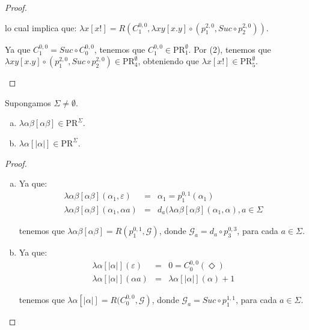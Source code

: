 \begin{proof}
\begin{enumerate}
        \par lo cual implica que: $\lambda x \left[x!\right] = R (C_{1}^{0, 0}, \lambda xy\left[x.y\right] \circ
        (p_{1}^{2, 0}, Suc \circ p_{2}^{2,0}))$.

        \par Ya que $C_{1}^{0, 0} = Suc \circ C_{0}^{0,0}$, tenemos que $C_{1}^{0, 0} \in \mathrm{PR}_{1}^{\emptyset}$.
        Por (2), tenemos que $\lambda xy \left[x.y\right] \circ (p_{1}^{2, 0}, Suc \circ p_{2}^{2,0}) \in
        \mathrm{PR}_{4}^{\emptyset}$, obteniendo que $\lambda x \left[x!\right] \in \mathrm{PR}_{5}^{\emptyset}$.
    \end{enumerate}
  \end{proof}

  \begin{lemma}
    \par Supongamos $\Sigma \neq \emptyset$.

    \begin{enumerate}[a)]
      \item $\lambda \alpha \beta \left[\alpha\beta\right] \in \mathrm{PR}^{\Sigma}$.
      \item $\lambda \alpha \left[\left\vert\alpha \right\vert\right] \in \mathrm{PR}^{\Sigma}$.
    \end{enumerate}
  \end{lemma}
  \begin{proof}
    \begin{enumerate}[a)]
      \item Ya que:
        \begin{eqnarray}
          \nonumber \lambda \alpha \beta \left[\alpha \beta\right](\alpha_{1}, \varepsilon) &=& \alpha_{1} =
          p_{1}^{0,1}(\alpha_{1}) \\
          \nonumber \lambda \alpha \beta \left[\alpha \beta\right](\alpha_{1}, \alpha a) &=& d_{a}(\lambda \alpha \beta
          \left[\alpha \beta\right](\alpha_{1}, \alpha), a \in \Sigma
        \end{eqnarray}

        \par tenemos que $\lambda \alpha \beta \left[\alpha \beta\right] = R(p_{1}^{0, 1}, \mathcal{G})$, donde
        $\mathcal{G}_{a} = d_{a} \circ p_{3}^{0,3}$, para cada $a \in \Sigma$.
      \item Ya que:
        \begin{eqnarray}
          \nonumber \lambda \alpha \left[\left\vert \alpha \right\vert\right](\varepsilon) &=& 0 =
          C_{0}^{0,0}(\Diamond) \\
          \nonumber \lambda \alpha \left[\left\vert \alpha \right\vert\right](\alpha a) &=& \lambda \alpha
          \left[\left\vert \alpha \right\vert\right](\alpha) + 1
        \end{eqnarray}

        \par tenemos que $\lambda \alpha \left[\left\vert \alpha \vert \right] = R(C_{0}^{0, 0}, \mathcal{G}\right)$,
        donde $\mathcal{G}_{a} = Suc \circ p_{1}^{1, 1}$, para cada $a \in \Sigma$.
    \end{enumerate}
  \end{proof}

